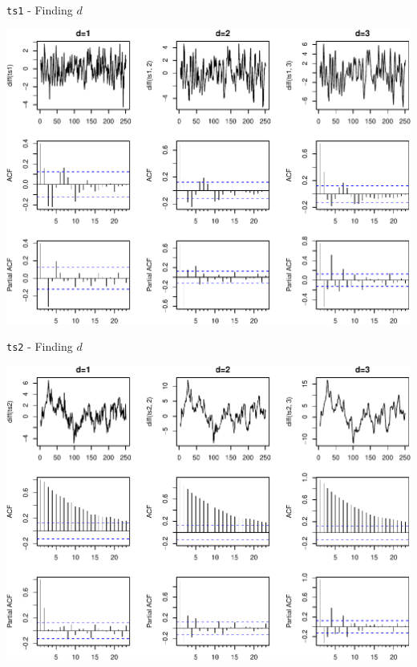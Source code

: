 \documentclass[11pt,ignorenonframetext,]{beamer}
\begin{document}
\begin{frame}{%
\protect\hypertarget{ts1---finding-d}{%
\texttt{ts1} - Finding \(d\)}}

\begin{center}\includegraphics[width=\textwidth]{Lec09_files/figure-beamer/unnamed-chunk-11-1} \end{center}

\end{frame}

\begin{frame}{%
\protect\hypertarget{ts2---finding-d}{%
\texttt{ts2} - Finding \(d\)}}

\begin{center}\includegraphics[width=\textwidth]{Lec09_files/figure-beamer/unnamed-chunk-12-1} \end{center}

\end{frame}
\end{document}
